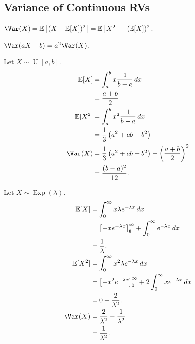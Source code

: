 \subsection{Variance of Continuous RVs}
\begin{definition}[Variance]
    $\Var(X) = \mathbb{E} \left[(X - \mathbb{E}[X])^2 \right] = \mathbb{E} \left[X^2 \right] - (\mathbb{E}[X])^2$.
\end{definition} 

\begin{claim}
    $\Var(aX + b) = a^2 \Var(X)$.
\end{claim} 

\begin{example}
    Let $X \sim \operatorname{U}[a, b]$.
    \begin{align*}
        \mathbb{E}[X] &= \int_{a}^{b} x \frac{1}{b - a} \,dx \\
        &= \frac{a + b}{2} \\
        \mathbb{E}[X^2] &= \int_{a}^{b} x^2 \frac{1}{b - a} \,dx \\
        &= \frac{1}{3} \left( a^2 + ab + b^2 \right) \\
        \Var(X) &= \frac{1}{3} \left( a^2 + ab + b^2 \right) - \left( \frac{a + b}{2} \right)^2 \\
        &= \frac{(b - a)^2}{12}.
    \end{align*} 
\end{example} 

\begin{example}
    Let $X \sim \operatorname{Exp}(\lambda)$.
    \begin{align*}
        \mathbb{E}[X] &= \int_{0}^{\infty} x \lambda e^{- \lambda x} \,dx \\
        &= \left[ - x e^{- \lambda x}\right]_0^\infty + \int_{0}^{\infty} e^{- \lambda x} \,dx \\
        &= \frac{1}{\lambda}. \\
        \mathbb{E}[X^2] &= \int_{0}^{\infty} x^2 \lambda e^{- \lambda x} \,dx \\
        &= \left[ - x^2 e^{- \lambda x}\right]_0^\infty + 2 \int_{0}^{\infty} x e^{- \lambda x} \,dx \\
        &= 0 + \frac{2}{\lambda^2}. \\
        \Var(X) &= \frac{2}{\lambda^2} - \frac{1}{\lambda^2} \\
        &= \frac{1}{\lambda^2}.
    \end{align*} 
\end{example} 

